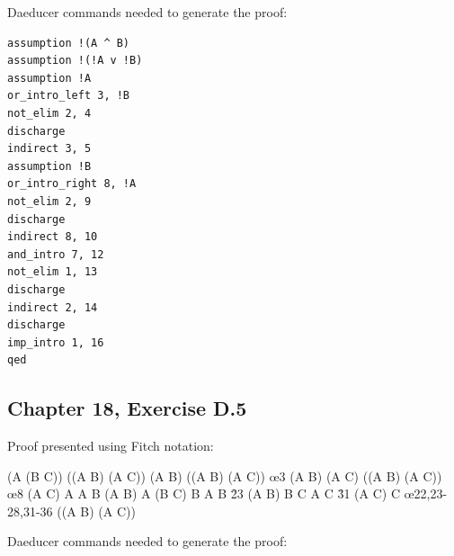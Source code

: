 \documentclass[10pt]{article}
\begin{document}
Daeducer commands needed to generate the proof:

\begin{lstlisting}[language=Daeducer]
assumption !(A ^ B)
assumption !(!A v !B)
assumption !A
or_intro_left 3, !B
not_elim 2, 4
discharge
indirect 3, 5
assumption !B
or_intro_right 8, !A
not_elim 2, 9
discharge
indirect 8, 10
and_intro 7, 12
not_elim 1, 13
discharge
indirect 2, 14
discharge
imp_intro 1, 16
qed
\end{lstlisting}

\subsection*{Chapter 18, Exercise D.5}

Proof presented using Fitch notation:

\begin{fitchproof}[arrayenv=longtable]
   {(A \to (B \lor C))} 
  \open
   {\neg ((A \to B) \lor (A \to C))} 
  \open
   {(A \to B)} 
   {((A \to B) \lor (A \to C))} \oe{3}
   {\bot} 
  \close
   {\neg (A \to B)} 
  \open
   {(A \to C)} 
   {((A \to B) \lor (A \to C))} \oe{8}
   {\bot} 
  \close
   {\neg (A \to C)} 
  \open
   {\neg A} 
  \open
   {A} 
   {\bot} 
   {B} 
  \close
   {(A \to B)} 
   {\bot} 
  \close
   {A} 
   {(B \lor C)} 
  \open
   {B} 
  \open
   {A} 
   {B} \r{23}
  \close
   {(A \to B)} 
   {\bot} 
  \close
   {\neg B} 
  \open
   {C} 
  \open
   {A} 
   {C} \r{31}
  \close
   {(A \to C)} 
   {\bot} 
  \close
   {\neg C} 
   {\bot} \oe{22,23-28,31-36}
  \close
   {((A \to B) \lor (A \to C))} 
\end{fitchproof}

Daeducer commands needed to generate the proof:
\end{document}
